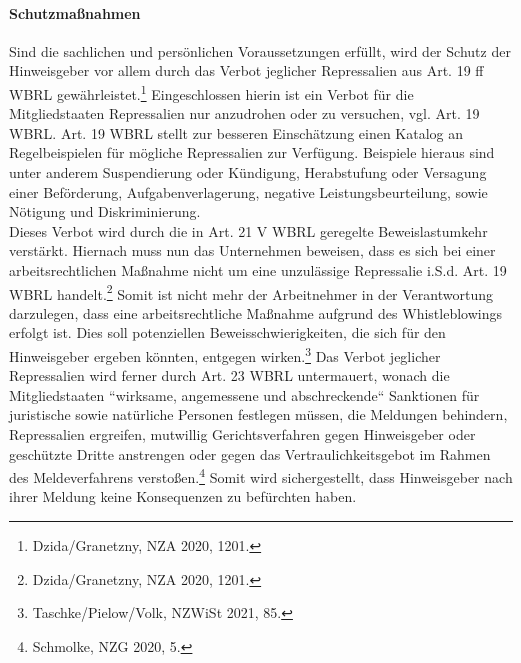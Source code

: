 \paragraph{Schutzmaßnahmen}
Sind die sachlichen und persönlichen Voraussetzungen erfüllt, wird der Schutz der Hinweisgeber vor allem durch das Verbot jeglicher Repressalien aus Art. 19 ff WBRL gewährleistet.\footnote{Dzida/Granetzny, NZA 2020, 1201.}
Eingeschlossen hierin ist ein Verbot für die Mitgliedstaaten Repressalien nur anzudrohen oder zu versuchen, vgl. Art. 19 WBRL.
Art. 19 WBRL stellt zur besseren Einschätzung einen Katalog an Regelbeispielen für mögliche Repressalien zur Verfügung.
Beispiele hieraus sind unter anderem Suspendierung oder Kündigung, Herabstufung oder Versagung einer Beförderung, Aufgabenverlagerung, negative Leistungsbeurteilung, sowie Nötigung und Diskriminierung.\\
Dieses Verbot wird durch die in Art. 21 V WBRL geregelte Beweislastumkehr verstärkt.
Hiernach muss nun das Unternehmen beweisen, dass es sich bei einer arbeitsrechtlichen Maßnahme nicht um eine unzulässige Repressalie i.S.d. Art. 19 WBRL handelt.\footnote{Dzida/Granetzny, NZA 2020, 1201.}
Somit ist nicht mehr der Arbeitnehmer in der Verantwortung darzulegen, dass eine arbeitsrechtliche Maßnahme aufgrund des Whistleblowings erfolgt ist.
Dies soll potenziellen Beweisschwierigkeiten, die sich für den Hinweisgeber ergeben könnten, entgegen wirken.\footnote{Taschke/Pielow/Volk, NZWiSt 2021, 85.}
Das Verbot jeglicher Repressalien wird ferner durch Art. 23 WBRL untermauert, wonach die Mitgliedstaaten “wirksame, angemessene und abschreckende“ Sanktionen für juristische sowie natürliche Personen festlegen müssen, die Meldungen behindern, Repressalien ergreifen, mutwillig Gerichtsverfahren gegen Hinweisgeber oder geschützte Dritte anstrengen oder gegen das Vertraulichkeitsgebot im Rahmen des Meldeverfahrens verstoßen.\footnote{Schmolke, NZG 2020, 5.}
Somit wird sichergestellt, dass Hinweisgeber nach ihrer Meldung keine Konsequenzen zu befürchten haben.

